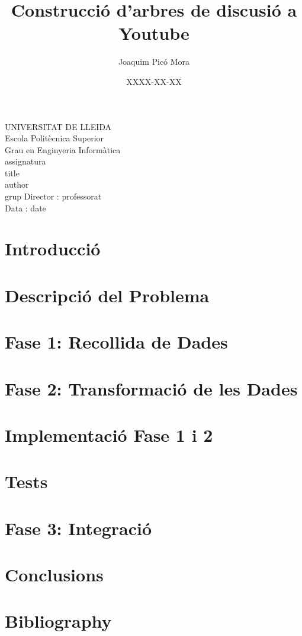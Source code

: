 \documentclass{article}
\title{Construcció d'arbres de discusió a Youtube}
\author{Joaquim Picó Mora}
\date{XXXX-XX-XX}
\renewcommand{\maketitle}{ %
	\begin{titlepage}
		\raggedright{UNIVERSITAT DE LLEIDA \\
			Escola Politècnica Superior \\
			Grau en Enginyeria Informàtica\\
			\1assignatura\\}
		\vspace{5cm}
		\centering\huge{\5title \\}
		\vspace{3cm}
		\large{\6author} \\
		\normalsize{\3grup}
		\vfill
		Director : \4professorat \\
		Data : \7date
\end{titlepage}}
\begin{document}
	\maketitle
	\thispagestyle{empty}
	\newpage
	\tableofcontents
	\newpage
	\section{Introducció}
	
	\newpage
	\section{Descripció del Problema}
	
	\newpage
	\section{Fase 1: Recollida de Dades}
	
	\section{Fase 2: Transformació de les Dades}
	
	\section{Implementació Fase 1 i 2}
	
	\section{Tests}
	
	\section{Fase 3: Integració}
	
	\section{Conclusions}
	
	\section{Bibliography}
	
	
\end{document}

